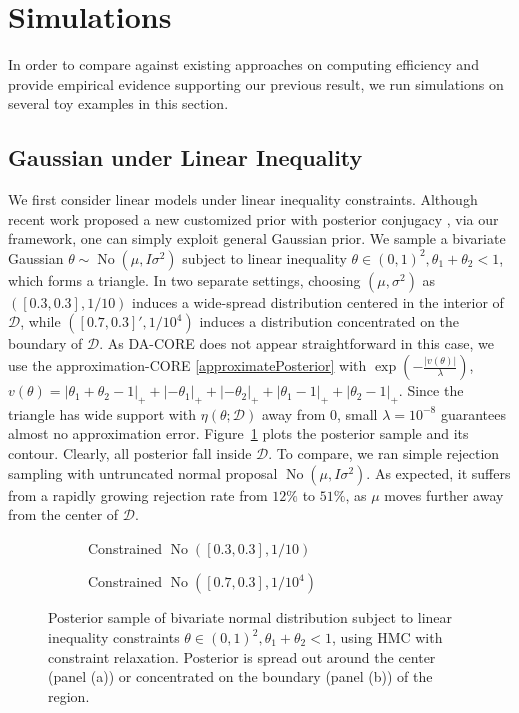 \documentclass[10pt,fleqn]{article}
\newcommand{\mc}[1]{\mathcal{#1}}
\DeclareMathOperator{\No}{No}
\DeclareMathOperator{\1}{\mathbbm{1}}
\begin{document}
\section{Simulations}
In order to compare against existing approaches on computing efficiency and provide empirical evidence
supporting our previous result, we run simulations on several toy examples
 in this section.
   
\subsection{Gaussian  under Linear Inequality}
We first consider linear models under linear inequality constraints. Although
recent work proposed a new customized prior with posterior conjugacy \citep{danaher2012minkowski},
via our framework, one can simply exploit general Gaussian prior. We sample a bivariate Gaussian $\theta \sim \No \left( \mu, I\sigma^2\right)$ subject to linear inequality $\theta\in(0,1)^2,\theta_1+\theta_2<1$,
which forms a triangle. In two separate settings, choosing $(\mu, \sigma^2)$ as $([0.3,0.3],1/{10})$  induces a wide-spread distribution centered in the interior of $\mc D$, while $([0.7,0.3]',1/10^4)$  induces a  distribution concentrated on the boundary of $\mc D$. As DA-CORE does not appear straightforward
in this case, we use the approximation-CORE  \eqref{approximatePosterior} with $\exp(-\frac{|v(\theta)|}{\lambda})$,  $v(\theta)=|\theta_1+\theta_2-1|_+ + |-\theta_1|_+ + |-\theta_2|_ + + |\theta_1-1|_+ + |\theta_2-1|_+$.  Since the triangle has wide support with $\eta(\theta;\mc D)$ away from $0$, small $\lambda=10^{-8}$
 guarantees almost no approximation error. Figure~\ref{linear_inequality} plots the posterior sample and its contour. Clearly, all posterior fall inside
$\mc D$. To compare, we ran simple rejection sampling with untruncated normal proposal $\No ( \mu, I\sigma^2)$. As expected, it  suffers from a rapidly growing rejection rate from $12\%$ to $51\%$, as $\mu$ moves further away from the center of $\mc D$.

\begin{figure}[H]
\begin{subfigure}[b]{0.45\textwidth}
\caption{Constrained $\No([0.3,0.3],1/{10})$}
\end{subfigure}
\begin{subfigure}[b]{0.45\textwidth}
\caption{Constrained $\No([0.7,0.3],1/{10^4})$}
\end{subfigure}
\caption{Posterior sample of bivariate normal distribution subject to linear inequality constraints $\theta\in(0,1)^2,\theta_1+\theta_2<1$, using HMC with  constraint relaxation. Posterior is spread out around the center (panel (a)) or concentrated on the boundary (panel (b)) of the region.}
\label{linear_inequality}
\end{figure}
\end{document}
